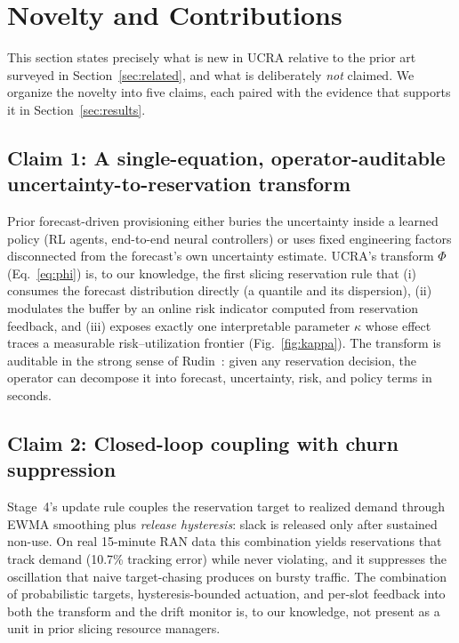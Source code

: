 \section{Novelty and Contributions}
\label{sec:novelty}

This section states precisely what is new in UCRA relative to the
prior art surveyed in Section~\ref{sec:related}, and what is
deliberately \emph{not} claimed. We organize the novelty into five
claims, each paired with the evidence that supports it in
Section~\ref{sec:results}.

\subsection{Claim 1: A single-equation, operator-auditable
uncertainty-to-reservation transform}

Prior forecast-driven provisioning either buries the uncertainty
inside a learned policy (RL agents, end-to-end neural controllers) or
uses fixed engineering factors disconnected from the forecast's own
uncertainty estimate. UCRA's transform $\Phi$ (Eq.~\eqref{eq:phi}) is,
to our knowledge, the first slicing reservation rule that (i) consumes
the forecast distribution directly (a quantile and its dispersion),
(ii) modulates the buffer by an online risk indicator computed from
reservation feedback, and (iii) exposes exactly one interpretable
parameter $\kappa$ whose effect traces a measurable risk--utilization
frontier (Fig.~\ref{fig:kappa}). The transform is auditable in the
strong sense of Rudin~\cite{rudin2019stop}: given any reservation
decision, the operator can decompose it into forecast, uncertainty,
risk, and policy terms in seconds.

\subsection{Claim 2: Closed-loop coupling with churn suppression}

Stage~4's update rule couples the reservation target to realized
demand through EWMA smoothing plus \emph{release hysteresis}: slack is
released only after sustained non-use. On real 15-minute RAN data this
combination yields reservations that track demand (10.7\% tracking
error) while never violating, and it suppresses the oscillation that
naive target-chasing produces on bursty traffic. The combination of
probabilistic targets, hysteresis-bounded actuation, and per-slot
feedback into both the transform and the drift monitor is, to our
knowledge, not present as a unit in prior slicing resource managers.

